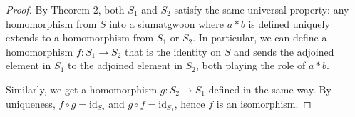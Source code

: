 \begin{proof}
By Theorem 2, both $S_1$ and $S_2$ satisfy the same universal property: any homomorphism from $S$ into a siumatgwoon where $a * b$ is defined uniquely extends to a homomorphism from $S_1$ or $S_2$. In particular, we can define a homomorphism $f: S_1 \to S_2$ that is the identity on $S$ and sends the adjoined element in $S_1$ to the adjoined element in $S_2$, both playing the role of $a * b$.

Similarly, we get a homomorphism $g: S_2 \to S_1$ defined in the same way. By uniqueness, $f \circ g = \mathrm{id}_{S_2}$ and $g \circ f = \mathrm{id}_{S_1}$, hence $f$ is an isomorphism.
\end{proof}








